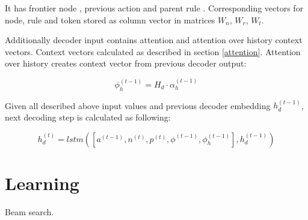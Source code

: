 It has frontier node , previous action  and parent rule . Corresponding vectors for node, rule and token stored as column vector in matrices $W_n$, $W_r$, $W_t$.

Additionally decoder input contains attention and attention over history context vectors. Context vectors calculated as described in section \ref{attention}. Attention over history creates context vector from previous decoder output:

\begin{equation}
    \phi_h^{(t-1)} = H_d\cdot\alpha_h^{(t-1)}
\end{equation}

Given all described above input values and previous decoder embedding $h_d^{(t-1)}$, next decoding step is calculated as following:

\begin{equation}
    h_d^{(t)}=lstm([a^{(t-1)}, n^{(t)}, p^{(t)}, \phi^{(t-1)}, \phi_h^{(t-1)}], h_d^{(t-1)})
\end{equation}



\section{Learning}
Beam search.